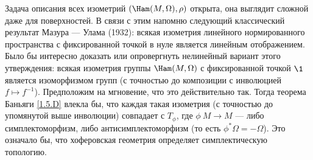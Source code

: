 Задача описания всех изометрий $(\Ham(M,\Omega), \rho)$ открыта,
она выглядит сложной даже для поверхностей. 
В связи с этим напомню следующий классический результат Мазура — Улама \cite{MU} (1932): всякая
изометрия линейного нормированного пространства с фиксированной точкой
в нуле является линейным отображением. 
Было бы интересно доказать или опровергнуть нелинейный вариант этого
утверждения: всякая изометрия группы $\Ham(M,\Omega)$ с фиксированной
точкой $\1$ является изоморфизмом групп (с точностью до композиции с
инволюцией $f\mapsto f^{-1}$). 
Предположим на мгновение, что это действительно так.
Тогда теорема Баньяги \ref{1.5.D} влекла бы, что
каждая такая изометрия (с точностью до упомянутой выше инволюции)
совпадает с $T_\phi$, где $\phi\: M \to M$ — либо симплектоморфизм,
либо антисимплектоморфизм (то есть $\phi^\ast\Omega = -\Omega$).
Это означало бы, что хоферовская геометрия определяет симплектическую топологию.
